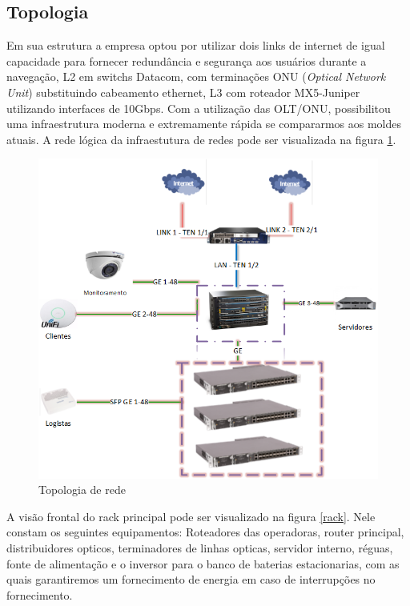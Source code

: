 \documentclass[	DIV=calc,%
							paper=a4,%
							fontsize=12pt,%
							onecolumn]{scrartcl}	 					%
\begin{document}
\subsection{Topologia}
Em sua estrutura a empresa optou por utilizar dois links de internet de igual capacidade para fornecer redundância e segurança aos usuários durante a navegação, L2 em switchs Datacom, com terminações ONU (\textit{Optical Network Unit}) substituindo cabeamento ethernet, L3 com roteador  MX5-Juniper utilizando interfaces de 10Gbps. 
Com a utilização das OLT/ONU, possibilitou uma infraestrutura moderna e extremamente rápida se compararmos aos moldes atuais.
A rede lógica da infraestutura de redes pode ser visualizada na figura \ref{topologia}.
\begin{figure}
\centering
\includegraphics[width=\textwidth]{topologia}
\caption{Topologia de rede}
\label{topologia}
\end{figure}
A visão frontal do rack principal pode ser visualizado na figura \ref{rack}. Nele constam os seguintes equipamentos: Roteadores das operadoras,  router principal, distribuidores opticos, terminadores de linhas opticas, servidor interno, réguas, fonte de alimentação e o inversor para o banco de baterias estacionarias, com as quais garantiremos um fornecimento de energia em caso de interrupções no fornecimento.
\end{document}
